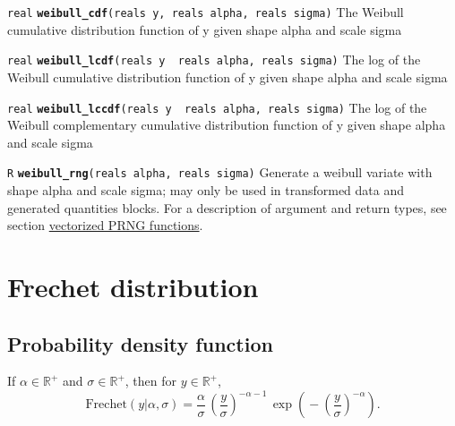 \documentclass[
  10pt,
]{book}
\begin{document}
\texttt{real} \textbf{\texttt{weibull\_cdf}}\texttt{(reals\ y,\ reals\ alpha,\ reals\ sigma)}\newline
The Weibull cumulative distribution function of y given shape alpha
and scale sigma


\texttt{real} \textbf{\texttt{weibull\_lcdf}}\texttt{(reals\ y\ \textbar{}\ reals\ alpha,\ reals\ sigma)}\newline
The log of the Weibull cumulative distribution function of y given
shape alpha and scale sigma


\texttt{real} \textbf{\texttt{weibull\_lccdf}}\texttt{(reals\ y\ \textbar{}\ reals\ alpha,\ reals\ sigma)}\newline
The log of the Weibull complementary cumulative distribution function
of y given shape alpha and scale sigma


\texttt{R} \textbf{\texttt{weibull\_rng}}\texttt{(reals\ alpha,\ reals\ sigma)}\newline
Generate a weibull variate with shape alpha and scale sigma; may only
be used in transformed data and generated quantities blocks.
For a description of argument and return types, see section
\protect\hyperlink{prng-vectorization}{vectorized PRNG functions}.

\hypertarget{frechet-distribution}{%
\section{Frechet distribution}\label{frechet-distribution}}

\hypertarget{probability-density-function-16}{%
\subsection{Probability density function}\label{probability-density-function-16}}

If \(\alpha \in \mathbb{R}^+\) and \(\sigma \in \mathbb{R}^+\), then for
\(y \in \mathbb{R}^+\), \[ \text{Frechet}(y|\alpha,\sigma) =
\frac{\alpha}{\sigma} \, \left( \frac{y}{\sigma} \right)^{-\alpha - 1}
\, \exp \! \left( \! - \left( \frac{y}{\sigma} \right)^{-\alpha}
\right) . \]
\end{document}
